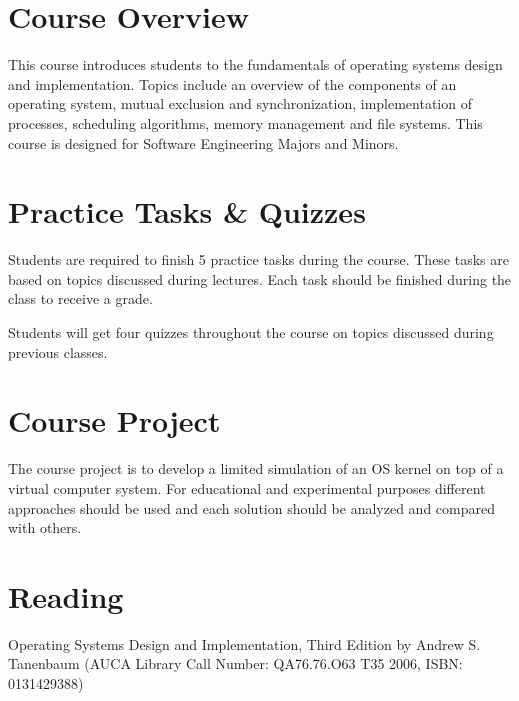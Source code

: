 \documentclass[12pt,a4paper,oneside]{article}
\begin{document}
    \section{Course Overview}

        This course introduces students to the fundamentals of operating systems design and implementation. Topics include an overview of the components of an operating system, mutual exclusion and synchronization, implementation of processes, scheduling algorithms, memory management and file systems. This course is designed for Software Engineering Majors and Minors.

    \section{Practice Tasks \& Quizzes}

        Students are required to finish 5 practice tasks during the course. These tasks are based on topics discussed during lectures. Each task should be finished during the class to receive a grade.

        Students will get four quizzes throughout the course on topics discussed during previous classes.

    \section{Course Project}

        The course project is to develop a limited simulation of an OS kernel on top of a virtual computer system. For educational and experimental purposes different approaches should be used and each solution should be analyzed and compared with others.

    \section{Reading}

        Operating Systems Design and Implementation, Third Edition by Andrew S. Tanenbaum (AUCA Library Call Number: QA76.76.O63 T35 2006, ISBN: 0131429388)
\end{document}
